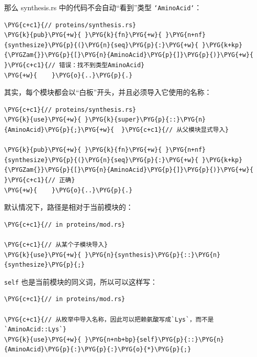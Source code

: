 那么 synthesis.rs 中的代码不会自动“看到”类型 \texttt{`AminoAcid`}：

\begin{Verbatim}[commandchars=\\\{\},breaklines=true,breakanywhere=true,fontsize=\codefont,xleftmargin=17bp]
\PYG{c+c1}{// proteins/synthesis.rs}
\PYG{k}{pub}\PYG{+w}{ }\PYG{k}{fn}\PYG{+w}{ }\PYG{n+nf}{synthesize}\PYG{p}{(}\PYG{n}{seq}\PYG{p}{:}\PYG{+w}{ }\PYG{k+kp}{\PYGZam{}}\PYG{p}{[}\PYG{n}{AminoAcid}\PYG{p}{]}\PYG{p}{)}\PYG{+w}{  }\PYG{c+c1}{// 错误：找不到类型AminoAcid}
\PYG{+w}{    }\PYG{o}{..}\PYG{p}{.}
\end{Verbatim}

其实，每个模块都会以“白板”开头，并且必须导入它使用的名称：

\begin{Verbatim}[commandchars=\\\{\},breaklines=true,breakanywhere=true,fontsize=\codefont,xleftmargin=17bp]
\PYG{c+c1}{// proteins/synthesis.rs}
\PYG{k}{use}\PYG{+w}{ }\PYG{k}{super}\PYG{p}{::}\PYG{n}{AminoAcid}\PYG{p}{;}\PYG{+w}{  }\PYG{c+c1}{// 从父模块显式导入}

\PYG{k}{pub}\PYG{+w}{ }\PYG{k}{fn}\PYG{+w}{ }\PYG{n+nf}{synthesize}\PYG{p}{(}\PYG{n}{seq}\PYG{p}{:}\PYG{+w}{ }\PYG{k+kp}{\PYGZam{}}\PYG{p}{[}\PYG{n}{AminoAcid}\PYG{p}{]}\PYG{p}{)}\PYG{+w}{  }\PYG{c+c1}{// 正确}
\PYG{+w}{    }\PYG{o}{..}\PYG{p}{.}
\end{Verbatim}

默认情况下，路径是相对于当前模块的：

\begin{Verbatim}[commandchars=\\\{\},breaklines=true,breakanywhere=true,fontsize=\codefont,xleftmargin=17bp]
\PYG{c+c1}{// in proteins/mod.rs}

\PYG{c+c1}{// 从某个子模块导入}
\PYG{k}{use}\PYG{+w}{ }\PYG{n}{synthesis}\PYG{p}{::}\PYG{n}{synthesize}\PYG{p}{;}
\end{Verbatim}

\texttt{self} 也是当前模块的同义词，所以可以这样写：

\begin{Verbatim}[commandchars=\\\{\},breaklines=true,breakanywhere=true,fontsize=\codefont,xleftmargin=17bp]
\PYG{c+c1}{// in proteins/mod.rs}

\PYG{c+c1}{// 从枚举中导入名称，因此可以把赖氨酸写成`Lys`，而不是`AminoAcid::Lys`}
\PYG{k}{use}\PYG{+w}{ }\PYG{n+nb+bp}{self}\PYG{p}{::}\PYG{n}{AminoAcid}\PYG{p}{:}\PYG{p}{:}\PYG{o}{*}\PYG{p}{;}
\end{Verbatim}


